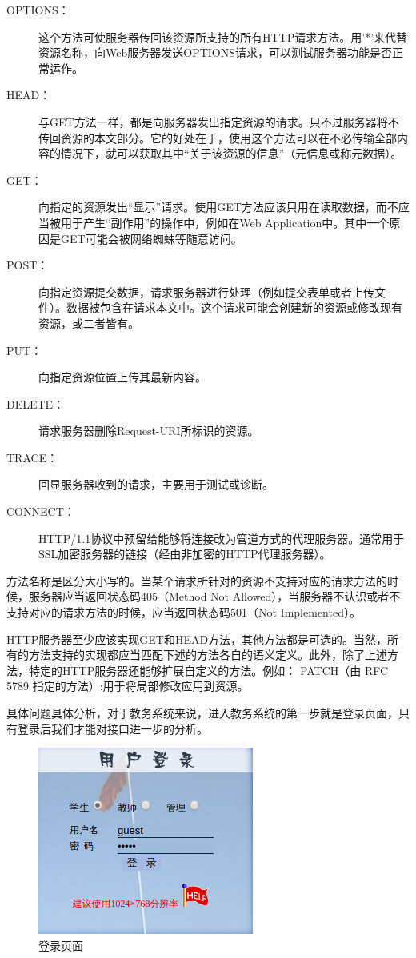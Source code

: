 \documentclass[UTF8, zihao=-4, heading=false]{ctexart}
\begin{document}
    \begin{description}
        \item[OPTIONS：] 这个方法可使服务器传回该资源所支持的所有HTTP请求方法。用'*'来代替资源名称，向Web服务器发送OPTIONS请求，可以测试服务器功能是否正常运作。
        \item[HEAD：] 与GET方法一样，都是向服务器发出指定资源的请求。只不过服务器将不传回资源的本文部分。它的好处在于，使用这个方法可以在不必传输全部内容的情况下，就可以获取其中“关于该资源的信息”（元信息或称元数据）。
        \item[GET：] 向指定的资源发出“显示”请求。使用GET方法应该只用在读取数据，而不应当被用于产生“副作用”的操作中，例如在Web Application中。其中一个原因是GET可能会被网络蜘蛛等随意访问。
        \item[POST：] 向指定资源提交数据，请求服务器进行处理（例如提交表单或者上传文件）。数据被包含在请求本文中。这个请求可能会创建新的资源或修改现有资源，或二者皆有。
        \item[PUT：] 向指定资源位置上传其最新内容。
        \item[DELETE：] 请求服务器删除Request-URI所标识的资源。
        \item[TRACE：] 回显服务器收到的请求，主要用于测试或诊断。
        \item[CONNECT：] HTTP/1.1协议中预留给能够将连接改为管道方式的代理服务器。通常用于SSL加密服务器的链接（经由非加密的HTTP代理服务器）。
    \end{description}

    方法名称是区分大小写的。当某个请求所针对的资源不支持对应的请求方法的时候，服务器应当返回状态码405（Method Not Allowed），当服务器不认识或者不支持对应的请求方法的时候，应当返回状态码501（Not Implemented）。\par
    HTTP服务器至少应该实现GET和HEAD方法，其他方法都是可选的。当然，所有的方法支持的实现都应当匹配下述的方法各自的语义定义。此外，除了上述方法，特定的HTTP服务器还能够扩展自定义的方法。例如：
PATCH（由 RFC 5789 指定的方法）:用于将局部修改应用到资源。\par
    具体问题具体分析，对于教务系统来说，进入教务系统的第一步就是登录页面，只有登录后我们才能对接口进一步的分析。\par
    
    \begin{figure}
        \centering
        \includegraphics[width=0.5\linewidth]{figure/interface-login}
        \caption{登录页面}
        \label{fig:interface-login}
    \end{figure}
    
\end{document}
